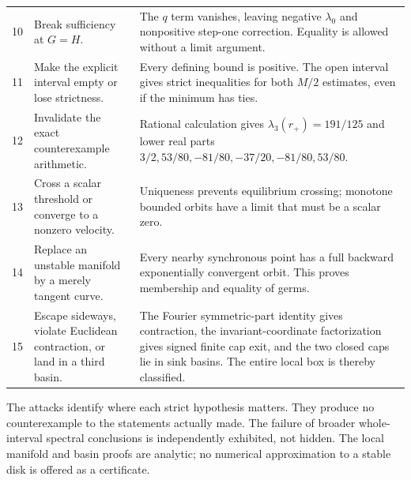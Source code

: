 \documentclass[11pt]{article}
\begin{document}
\begin{longtable}{@{}p{}>{\raggedright\arraybackslash}p{}>{\raggedright\arraybackslash}p{}@{}}
10&Break sufficiency at $G=H$.&The $q$ term vanishes, leaving negative $\lambda_0$ and nonpositive step-one correction. Equality is allowed without a limit argument.\\
11&Make the explicit interval empty or lose strictness.&Every defining bound is positive. The open interval gives strict inequalities for both $M/2$ estimates, even if the minimum has ties.\\
12&Invalidate the exact counterexample arithmetic.&Rational calculation gives $\lambda_3(r_+)=191/125$ and lower real parts $3/2,53/80,-81/80,-37/20,-81/80,53/80$.\\
13&Cross a scalar threshold or converge to a nonzero velocity.&Uniqueness prevents equilibrium crossing; monotone bounded orbits have a limit that must be a scalar zero.\\
14&Replace an unstable manifold by a merely tangent curve.&Every nearby synchronous point has a full backward exponentially convergent orbit. This proves membership and equality of germs.\\
15&Escape sideways, violate Euclidean contraction, or land in a third basin.&The Fourier symmetric-part identity gives contraction, the invariant-coordinate factorization gives signed finite cap exit, and the two closed caps lie in sink basins. The entire local box is thereby classified.\\
\bottomrule
\end{longtable}
\normalsize

The attacks identify where each strict hypothesis matters. They produce no
counterexample to the statements actually made. The failure of broader
whole-interval spectral conclusions is independently exhibited, not hidden.
The local manifold and basin proofs are analytic; no numerical approximation
to a stable disk is offered as a certificate.
\end{document}
